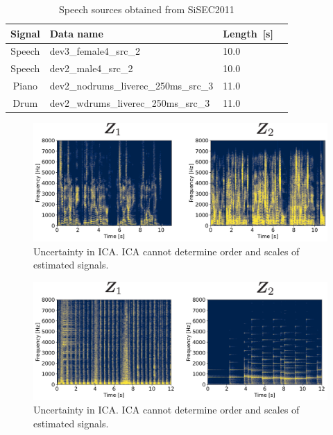 \begin{table}[t]
  \begin{center}
   \caption{Speech sources obtained from SiSEC2011}
   \label{table:wav}
    \begin{tabular}{clll}\hline \hline
     Signal  & Data name &Length~[s]  \\ \hline
     Speech  & dev3\_female4\_src\_2 & 10.0  \\ \hline
     Speech  & dev2\_male4\_src\_2 &  10.0 \\ \hline
     Piano   & dev2\_nodrums\_liverec\_250ms\_src\_3 & 11.0\\ \hline
     Drum   & dev2\_wdrums\_liverec\_250ms\_src\_3 & 11.0 \\ \hline 
     \hline
    \end{tabular}
   \end{center}
\end{table}
\begin{figure}[t]
  \begin{center}
      \includegraphics[width=0.95\columnwidth]{figures/audio_init_spec.pdf}
  \end{center}
  \vspace{-8pt}
\caption{Uncertainty in ICA. ICA cannot determine order and scales of estimated signals.}
\label{fig:audio}
\end{figure}

\begin{figure}[t]
  \begin{center}
      \includegraphics[width=0.95\columnwidth]{figures/Drum_init_spec.pdf}
  \end{center}
  \vspace{-8pt}
\caption{Uncertainty in ICA. ICA cannot determine order and scales of estimated signals.}
\label{fig:drum}
\end{figure}

